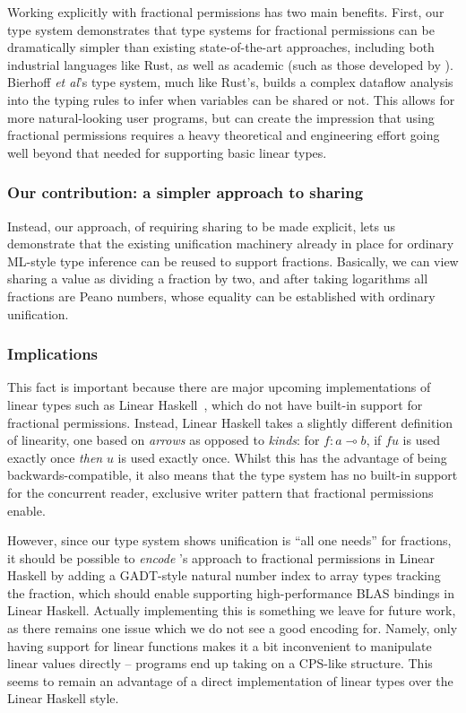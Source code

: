 Working explicitly with fractional permissions has two main benefits. First,
our type system demonstrates that type systems for fractional permissions can
be dramatically simpler than existing state-of-the-art approaches, including
both industrial languages like Rust, as well as academic (such as those
developed by \cite{bierhoff}).  Bierhoff \emph{et al}'s type system, much like
Rust's, builds a complex dataflow analysis into the typing rules to infer when
variables can be shared or not. This allows for more natural-looking user
programs, but can create the impression that using fractional permissions
requires a heavy theoretical and engineering effort going well beyond that
needed for supporting basic linear types.

\subsubsection{Our contribution: a simpler approach to sharing}

Instead, our approach, of requiring sharing to be made explicit, lets us
demonstrate that the existing unification machinery already in place for
ordinary ML-style type inference can be reused to support fractions. Basically,
we can view sharing a value as dividing a fraction by two, and after taking
logarithms all fractions are Peano numbers, whose equality can be established
with ordinary unification.

\subsubsection{Implications}

This fact is important because there are major upcoming implementations of
linear types such as Linear Haskell~\cite{bernardy2017linear}, which do not
have built-in support for fractional permissions. Instead, Linear Haskell takes
a slightly different definition of linearity, one based on \emph{arrows} as
opposed to \emph{kinds}: for $f : a \multimap b$, if $f u$ is used exactly once
\emph{then} $u$ is used exactly once. Whilst this has the advantage of being
backwards-compatible, it also means that the type system has no built-in
support for the concurrent reader, exclusive writer pattern that fractional
permissions enable.

However, since our type system shows unification is ``all one
needs'' for fractions, it should be possible to \emph{encode} \lang's approach
to fractional permissions in Linear Haskell by adding a GADT-style natural
number index to array types tracking the fraction, which should enable
supporting high-performance BLAS bindings in Linear Haskell. Actually
implementing this is something we leave for future work, as there remains one
issue which we do not see a good encoding for. Namely, only having support for
linear functions makes it a bit inconvenient to manipulate linear values
directly -- programs end up taking on a CPS-like structure. This seems to
remain an advantage of a direct implementation of linear types over the Linear
Haskell style.


